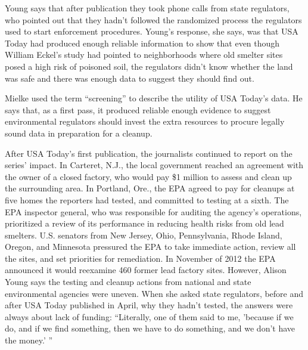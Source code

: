 Young says that after publication they took phone calls from state regulators,
who pointed out that they hadn't followed the randomized process
the regulators used to start enforcement procedures. Young's response, she
says, was that USA Today had produced enough reliable information to
show that even though William Eckel's study had pointed to neighborhoods
where old smelter sites posed a high risk of poisoned soil, the regulators
didn't know whether the land was safe and there was enough data to suggest
they should find out.

Mielke used the term ``screening'' to describe the utility of USA Today's
data. He says that, as a first pass, it produced reliable enough evidence to
suggest environmental regulators should invest the extra resources to procure
legally sound data in preparation for a cleanup.

After USA Today's first publication, the journalists continued to report on
the series' impact. In Carteret, N.J., the local government reached an agreement
with the owner of a closed factory, who would pay \$1 million to assess
and clean up the surrounding area. In Portland, Ore., the EPA agreed to pay
for cleanups at five homes the reporters had tested, and committed to testing
at a sixth. The EPA inspector general, who was responsible for auditing
the agency's operations, prioritized a review of its performance in reducing
health risks from old lead smelters. U.S. senators from New Jersey, Ohio,
Pennsylvania, Rhode Island, Oregon, and Minnesota pressured the EPA to
take immediate action, review all the sites, and set priorities for remediation.
In November of 2012 the EPA announced it would reexamine 460 former
lead factory sites. However, Alison Young says the testing and cleanup
actions from national and state environmental agencies were uneven. When
she asked state regulators, before and after USA Today published in April,
why they hadn't tested, the answers were always about lack of funding: ``Literally,
one of them said to me, 'because if we do, and if we find something,
then we have to do something, and we don't have the money.' ''

